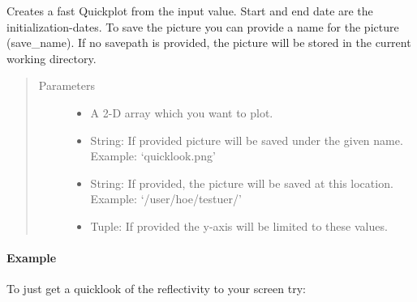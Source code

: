 \documentclass[letterpaper,10pt,english]{sphinxmanual}
\begin{document}
\begin{fulllineitems}
\begin{fulllineitems}
\label{\detokenize{generated/MPPy.Instruments.Radar.Radar.quickplot2D:MPPy.Instruments.Radar.Radar.quickplot2D}}
Creates a fast Quickplot from the input value. Start and end date are the initialization-dates. To save the
picture you can provide a name for the picture (save\_name). If no savepath is provided, the picture will be
stored in the current working directory.
\begin{quote}\begin{description}
\item[{Parameters}] \leavevmode\begin{itemize}
\item {} 
 \textendash{} A 2-D array which you want to plot.

\item {} 
 \textendash{} String: If provided picture will be saved under the given name. Example: ‘quicklook.png’

\item {} 
 \textendash{} String: If provided, the picture will be saved at this location. Example: ‘/user/hoe/testuer/’

\item {} 
 \textendash{} Tuple: If provided the y-axis will be limited to these values.

\end{itemize}

\end{description}\end{quote}
\paragraph{Example}

To just get a quicklook of the reflectivity to your screen try:

\begin{sphinxVerbatim}[commandchars=\\\{\}]
   
\end{sphinxVerbatim}


\end{fulllineitems}
\end{fulllineitems}
\end{document}

